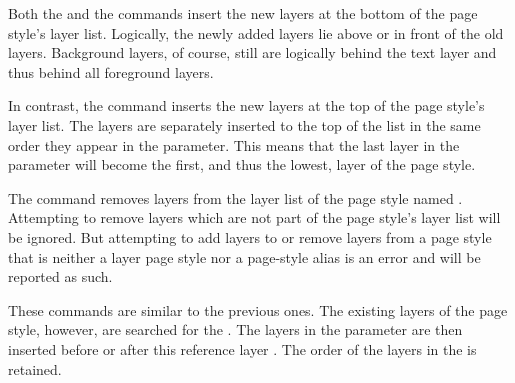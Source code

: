 Both the  and the
 commands insert the
new layers at the bottom of the page style's layer list. Logically, the newly
added layers lie above or in front of the old layers. Background layers, of
course, still are logically behind the text layer and thus behind all
foreground layers.

In contrast, the  command inserts the new layers at the top of the page style's
layer list. The layers are separately inserted to the top of the list in the
same order they appear in the  parameter. This means that
the last layer in the  parameter will become the first, and
thus the lowest, layer of the page style.

The  command removes layers
from the layer list of the page style named .
Attempting to remove layers which are not part of the page style's layer list
will be ignored. But attempting to add layers to or remove layers from a page
style that is neither a layer page style nor a page-style alias is an error
and will be reported as such.%
\EndIndexGroup


\begin{Declaration}
\end{Declaration}
%
%
\iffalse%
These two commands are similar to the previous ones, but they take an
additional parameter,  \Parameter{reference layer name}. The layer list of
the page style named in \Parameter{page style name} is searched for this
reference layer. %
\else%
These commands are similar to the previous ones. The existing layers of the
page style, however, are searched for the . %
\fi%
The layers in the  parameter are then inserted
before or after this reference layer%
%
. The order of the layers in the  is retained.

